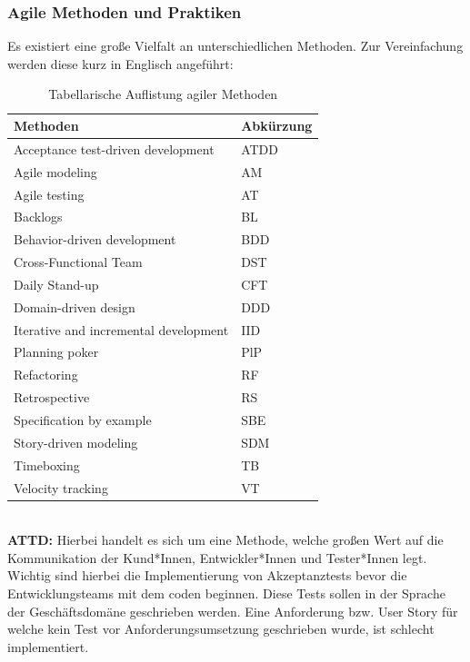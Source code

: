 \subsubsection{Agile Methoden und Praktiken}
Es existiert eine große Vielfalt an unterschiedlichen Methoden. Zur Vereinfachung werden diese kurz in Englisch angeführt:
\begin{table}[h!]
    \centering
    \caption{Tabellarische Auflistung agiler Methoden}
    \label{tab:agile-methods}
    \begin{tabular}{|l|l|}
    \hline
    \textbf{Methoden} & \textbf{Abkürzung} \\ \hline
    Acceptance test-driven development  & ATDD                 \\ \hline
    Agile modeling    & AM                \\ \hline
    Agile testing             & AT          \\ \hline
    Backlogs & BL                \\ \hline
    Behavior-driven development & BDD                 \\ \hline
    Cross-Functional Team     & DST                \\ \hline
    Daily Stand-up    & CFT                \\ \hline
    Domain-driven design   & DDD               \\ \hline
    Iterative and incremental development    & IID               \\ \hline
    Planning poker  & PlP               \\ \hline
    Refactoring  & RF               \\ \hline
    Retrospective  & RS               \\ \hline
    Specification by example  & SBE               \\ \hline
    Story-driven modeling  & SDM               \\ \hline
    Timeboxing   & TB               \\ \hline
    Velocity tracking   & VT               \\ \hline
    \end{tabular}
\end{table} \\

\textbf{ATTD:} Hierbei handelt es sich um eine Methode, welche großen Wert auf die Kommunikation der Kund*Innen, Entwickler*Innen und Tester*Innen legt. 
Wichtig sind hierbei die Implementierung von Akzeptanztests bevor die Entwicklungsteams mit dem coden beginnen. 
Diese Tests sollen in der Sprache der Geschäftsdomäne geschrieben werden. Eine Anforderung bzw. User Story für welche kein Test vor Anforderungsumsetzung geschrieben wurde, ist schlecht implementiert.\cite{Downs2011-uk}\\

